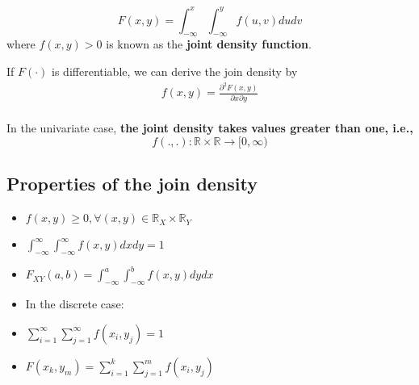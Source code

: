 \documentclass[12pt]{article}
\begin{document}
\begin{equation*}
F(x,y) = \int_{ - \infty }^{x}\int_{ - \infty }^{y} f(u,v)du dv 
\end{equation*}
where $ f(x,y) > 0 $ is known as the {\textbf {joint density function}}.

If $ F(\cdot ) $ is differentiable, we can derive the join density by
\begin{align*}
f(x,y) = \frac{\partial^{2}F(x,y)  }{\partial x \partial y }
\end{align*}
\noindent{}\\

In the univariate case, {\textbf {the joint density takes values greater than one,
i.e., }}
\begin{equation*}
		f(.,.) : \mathbb{R} \times \mathbb{R} \rightarrow [0, \infty )
\end{equation*}

\subsection{Properties of the join density}
\begin{itemize}
\item $ f(x,y) \ge 0, \forall (x,y) \in \mathbb{R}_{X} \times \mathbb{R}_{Y}$ 
\item $ \int_{ - \infty }^{\infty } \int_{ - \infty }^{\infty }f(x,y)dx dy  = 1 $
\item $ F_{XY}(a,b) = \int_{ - \infty }^{a}\int_{ - \infty }^{b}f(x,y)dydx   $
\item In the discrete case:
\item $ \sum\limits_{i = 1} ^\infty \sum\limits_{j = 1} ^\infty f(x_{i},y_{j}) = 1 $
\item $ F(x_{k},y_{m}) = \sum\limits_{i = 1} ^k \sum\limits_{j = 1} ^m f(x_{i},y_{j})		 $
\end{itemize}






\end{document}
